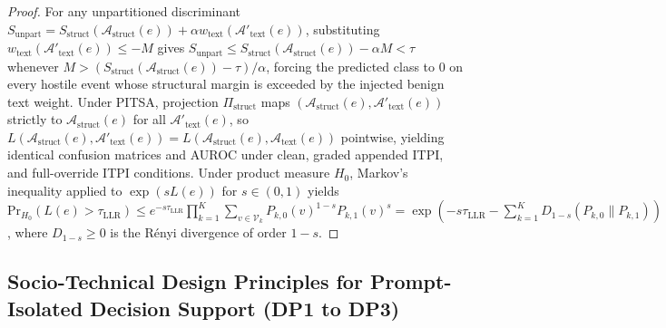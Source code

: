 \documentclass[11pt,a4paper]{article}
\begin{document}
\begin{proof}
For any unpartitioned discriminant $S_{\text{unpart}} = S_{\text{struct}}(\mathcal{A}_{\text{struct}}(e)) + \alpha w_{\text{text}}(\mathcal{A}'_{\text{text}}(e))$, substituting $w_{\text{text}}(\mathcal{A}'_{\text{text}}(e)) \le -M$ gives $S_{\text{unpart}} \le S_{\text{struct}}(\mathcal{A}_{\text{struct}}(e)) - \alpha M < \tau$ whenever $M > (S_{\text{struct}}(\mathcal{A}_{\text{struct}}(e)) - \tau)/\alpha$, forcing the predicted class to $0$ on every hostile event whose structural margin is exceeded by the injected benign text weight. Under PITSA, projection $\Pi_{\text{struct}}$ maps $(\mathcal{A}_{\text{struct}}(e), \mathcal{A}'_{\text{text}}(e))$ strictly to $\mathcal{A}_{\text{struct}}(e)$ for all $\mathcal{A}'_{\text{text}}(e)$, so $L(\mathcal{A}_{\text{struct}}(e), \mathcal{A}'_{\text{text}}(e)) = L(\mathcal{A}_{\text{struct}}(e), \mathcal{A}_{\text{text}}(e))$ pointwise, yielding identical confusion matrices and AUROC under clean, graded appended ITPI, and full-override ITPI conditions. Under product measure $H_0$, Markov's inequality applied to $\exp(s L(e))$ for $s \in (0, 1)$ yields $\text{Pr}_{H_0}(L(e) > \tau_{\text{LLR}}) \le e^{-s\tau_{\text{LLR}}} \prod_{k=1}^K \sum_{v \in \mathcal{V}_k} P_{k,0}(v)^{1-s} P_{k,1}(v)^s = \exp(-s\tau_{\text{LLR}} - \sum_{k=1}^K D_{1-s}(P_{k,0} \parallel P_{k,1}))$, where $D_{1-s} \ge 0$ is the R\'{e}nyi divergence of order $1-s$.
\end{proof}

\subsection{Socio-Technical Design Principles for Prompt-Isolated Decision Support (DP1 to DP3)}
\label{subsec:design_principles}
\end{document}
